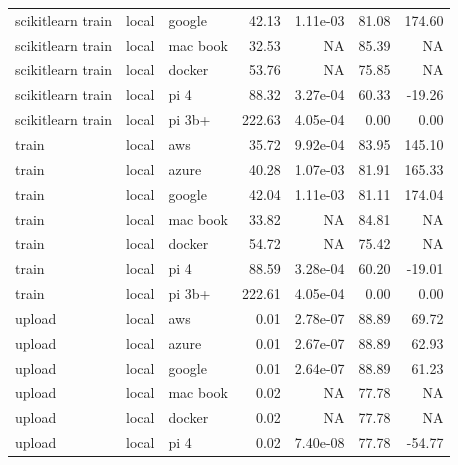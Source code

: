 \begin{table}[htb]
{\begin{tabular}{lllrrrr}
 scikitlearn train &   local &    google &   42.13 & 1.11e-03 &               81.08 &           174.60 \\
 scikitlearn train &   local &  mac book &   32.53 &      NA &               85.39 &              NA \\
 scikitlearn train &   local &    docker &   53.76 &      NA &               75.85 &              NA \\
 scikitlearn train &   local &      pi 4 &   88.32 & 3.27e-04 &               60.33 &           -19.26 \\
 scikitlearn train &   local &    pi 3b+ &  222.63 & 4.05e-04 &                0.00 &             0.00 \\
\midrule
             train &   local &       aws &   35.72 & 9.92e-04 &               83.95 &           145.10 \\
             train &   local &     azure &   40.28 & 1.07e-03 &               81.91 &           165.33 \\
             train &   local &    google &   42.04 & 1.11e-03 &               81.11 &           174.04 \\
             train &   local &  mac book &   33.82 &      NA &               84.81 &              NA \\
             train &   local &    docker &   54.72 &      NA &               75.42 &              NA \\
             train &   local &      pi 4 &   88.59 & 3.28e-04 &               60.20 &           -19.01 \\
             train &   local &    pi 3b+ &  222.61 & 4.05e-04 &                0.00 &             0.00 \\
\midrule
            upload &   local &       aws &    0.01 & 2.78e-07 &               88.89 &            69.72 \\
            upload &   local &     azure &    0.01 & 2.67e-07 &               88.89 &            62.93 \\
            upload &   local &    google &    0.01 & 2.64e-07 &               88.89 &            61.23 \\
            upload &   local &  mac book &    0.02 &      NA &               77.78 &              NA \\
            upload &   local &    docker &    0.02 &      NA &               77.78 &              NA \\
            upload &   local &      pi 4 &    0.02 & 7.40e-08 &               77.78 &           -54.77 \\

\end{tabular}}
\end{table}
